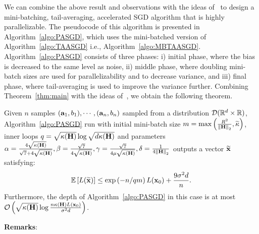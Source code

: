 \iffalse
We can combine the above result and observations with the ideas of~\cite{JainKKNS16} to design a mini-batching, tail-averaging, accelerated SGD algorithm that is highly parallelizable. The pseudocode of this algorithm is presented in Algorithm~\ref{algo:PASGD}, which uses the mini-batched version of Algorithm~\ref{algo:TAASGD} i.e., Algorithm~\ref{algo:MBTAASGD}. Algorithm~\ref{algo:PASGD} consists of three phases: i) initial phase, where the bias is decreased to the same level as noise, ii) middle phase, where doubling mini-batch sizes are used for parallelizability and to decrease variance, and iii) final phase, where tail-averaging is used to improve the variance further. Combining Theorem~\ref{thm:main} with the ideas of~\cite{JainKKNS16}, we obtain the following theorem.
\begin{theorem}\label{thm:par}
	Given $n$ samples $(\ai[1],\bi[1]),\cdots, (\ai[n],\bi[n])$ sampled from a distribution $\D(\R^{d}\times \R)$, Algorithm~\ref{algo:PASGD} run with initial mini-batch size $m=\max\left(\frac{R^2}{\twonorm{\Cov}},{\cnS}\right)$, inner loops $q = \sqrt{\kappa(\Cov)} \log \sqrt{d \kappa(\Cov)}$ and parameters $\alpha = \frac{4\sqrt{\kappa(\Cov)}}{\sqrt{7}+4\sqrt{\kappa(\Cov)}}, \beta = \frac{\sqrt{7}}{4\sqrt{\kappa(\Cov)}}, \gamma =  \frac{\sqrt{7}}{4 \mu \sqrt{\kappa(\Cov)}}, \delta = \frac{1}{4\twonorm{\Cov}}$ outputs a vector $\xtilde$ satisfying:
	\begin{align*}
	\E{L(\xtilde)} \leq \exp\left(-n/qm\right) L(\xt[0]) + \frac{9 \sigma^2 d}{n}.
	\end{align*}
	Furthermore, the depth of Algorithm~\ref{algo:PASGD} in this case is at most $\order{\sqrt{\kappa(\Cov)}\log \frac{n \kappa(\Cov)L(\xt[0])}{\sigma^2 d}}$.
\end{theorem}
\textbf{Remarks}:
